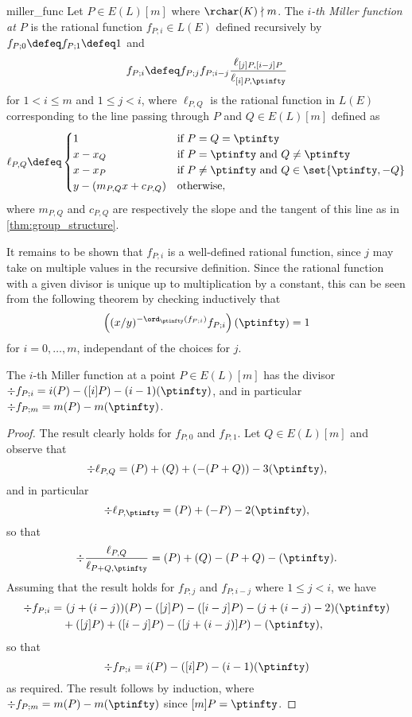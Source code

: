 \begin{dfn}{}{miller_func}
Let $P \in E(L)[m]$ where $\rchar(K) \nmid m$. The \emph{$i$-th Miller function at $P$} is the rational function $f_{P;i} \in L(E)$ defined recursively by $f_{P;0} \defeq f_{P;1} \defeq 1$ and
\[
f_{P;i} \defeq f_{P;j} f_{P;i-j} \frac{\ell_{[j]P,[i-j]P}}{\ell_{[i]P,\ptinfty}}
\]
for $1 < i \leq m$ and $1 \leq j < i$, where $\ell_{P, Q}$ is the rational function in $L(E)$ corresponding to the line passing through $P$ and $Q \in E(L)[m]$ defined as
\[
\ell_{P, Q} \defeq \begin{cases}
1 & \text{if $P = Q = \ptinfty$} \\
x - x_Q & \text{if $P = \ptinfty$ and $Q \neq \ptinfty$} \\
x - x_P & \text{if $P \neq \ptinfty$ and $Q \in \set{\ptinfty, -Q}$} \\
y - (m_{P,Q} x + c_{P,Q}) & \text{otherwise},
\end{cases}
\]
where $m_{P,Q}$ and $c_{P,Q}$ are respectively the slope and the tangent of this line as in \cref{thm:group_structure}.
\end{dfn}

It remains to be shown that $f_{P;i}$ is a well-defined rational function, since $j$ may take on multiple values in the recursive definition. Since the rational function with a given divisor is unique up to multiplication by a constant, this can be seen from the following theorem by checking inductively that \[\left((x/y)^{-\ord_\ptinfty(f_{P;i})} f_{P;i}\right)(\ptinfty) = 1\]
for $i = 0, \ldots, m$, independant of the choices for $j$.

\begin{thm}{}{}
The $i$-th Miller function at a point $P \in E(L)[m]$ has the divisor $\div f_{P;i} = i(P) - ([i] P) - (i-1)(\ptinfty)$, and in particular $\div f_{P;m} = m(P) - m(\ptinfty)$.
\end{thm}
\begin{proof}
The result clearly holds for $f_{P; 0}$ and $f_{P; 1}$. Let $Q \in E(L)[m]$ and observe that \[\div \ell_{P, Q} = (P) + (Q) + (-(P + Q)) - 3(\ptinfty),\] and in particular \[\div \ell_{P, \ptinfty} = (P) + (-P) - 2(\ptinfty),\] so that \[\div \frac{\ell_{P, Q}}{\ell_{P+Q, \ptinfty}} = (P) + (Q) - (P + Q) - (\ptinfty).\] Assuming that the result holds for $f_{P;j}$ and $f_{P;i-j}$ where $1 \leq j < i$, we have
\begin{align*}
\div f_{P;i} =&\ (j+(i-j))(P) - ([j]P) - ([i-j]P) - (j+(i-j)-2)(\ptinfty) \\
&+ ([j]P) + ([i-j]P) - ([j+(i-j)]P) - (\ptinfty),
\end{align*}
so that \[\div f_{P;i} = i(P) - ([i]P) - (i-1)(\ptinfty)\] as required. The result follows by induction, where $\div f_{P;m} = m(P) - m(\ptinfty)$ since $[m] P = \ptinfty$.
\end{proof}

